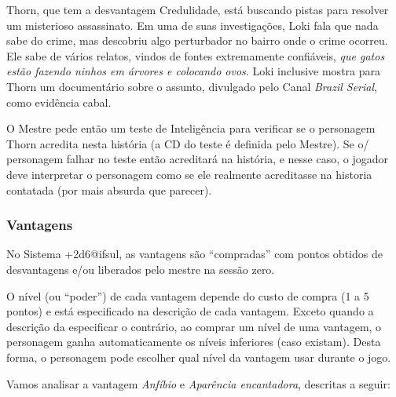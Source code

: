 Thorn, que tem a desvantagem Credulidade, está buscando pistas para resolver um misterioso assassinato. Em uma de suas investigações, Loki fala que nada sabe do crime, mas descobriu algo perturbador no bairro onde o crime ocorreu. Ele sabe de vários relatos, vindos de fontes extremamente confiáveis, \emph{que gatos estão fazendo ninhos em árvores e colocando ovos}. Loki inclusive mostra para Thorn um documentário sobre o assunto, divulgado pelo Canal \emph{Brazil Serial}, como evidência cabal.

O Mestre pede então um teste de Inteligência para verificar se o personagem Thorn acredita nesta história (a CD do teste é definida pelo Mestre). Se o/ personagem falhar no teste então acreditará na história, e nesse caso, o jogador deve interpretar o personagem como se ele realmente acreditasse na historia contatada (por mais absurda que parecer).

\subsubsection*{Vantagens}

No Sistema +2d6@ifsul, as vantagens são ``compradas'' com pontos obtidos de desvantagens e/ou liberados pelo mestre na sessão zero. 


O nível (ou ``poder'') de cada vantagem depende do custo de compra (1 a 5 pontos) e está especificado na descrição de cada vantagem. Exceto quando a descrição da especificar o contrário, ao comprar um nível de uma vantagem, o personagem ganha automaticamente os níveis inferiores (caso existam). Desta forma, o personagem pode escolher qual nível da vantagem usar durante o jogo. 

Vamos analisar a vantagem \emph{Anfíbio} e \emph{Aparência encantadora}, descritas a seguir:

